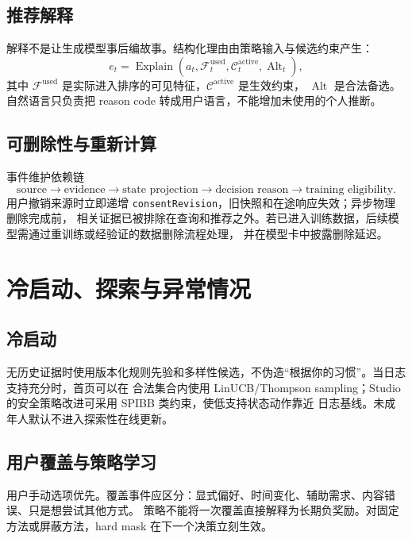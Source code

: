 \documentclass[11pt,a4paper,fontset=none]{ctexart}
\newcommand{\1}{\mathbb{I}}
\begin{document}
\subsection{推荐解释}

解释不是让生成模型事后编故事。结构化理由由策略输入与候选约束产生：
\begin{equation}
  e_t=\operatorname{Explain}
  \left(a_t,\mathcal{F}^{\mathrm{used}}_t,
  \mathcal{C}^{\mathrm{active}}_t,\operatorname{Alt}_t\right),
\end{equation}
其中 $\mathcal{F}^{\mathrm{used}}$ 是实际进入排序的可见特征，$\mathcal{C}^{\mathrm{active}}$ 是生效约束，
$\operatorname{Alt}$ 是合法备选。自然语言只负责把 reason code 转成用户语言，不能增加未使用的个人推断。

\subsection{可删除性与重新计算}

事件维护依赖链
\[
  \text{source}\rightarrow\text{evidence}\rightarrow\text{state projection}
  \rightarrow\text{decision reason}\rightarrow\text{training eligibility}.
\]
用户撤销来源时立即递增 \texttt{consentRevision}，旧快照和在途响应失效；异步物理删除完成前，
相关证据已被排除在查询和推荐之外。若已进入训练数据，后续模型需通过重训练或经验证的数据删除流程处理，
并在模型卡中披露删除延迟。

\section{冷启动、探索与异常情况}

\subsection{冷启动}

无历史证据时使用版本化规则先验和多样性候选，不伪造“根据你的习惯”。当日志支持充分时，首页可以在
合法集合内使用 LinUCB/Thompson sampling；Studio 的安全策略改进可采用 SPIBB 类约束，使低支持状态动作靠近
日志基线。未成年人默认不进入探索性在线更新。

\subsection{用户覆盖与策略学习}

用户手动选项优先。覆盖事件应区分：显式偏好、时间变化、辅助需求、内容错误、只是想尝试其他方式。
策略不能将一次覆盖直接解释为长期负奖励。对固定方法或屏蔽方法，hard mask 在下一个决策立刻生效。
\end{document}
